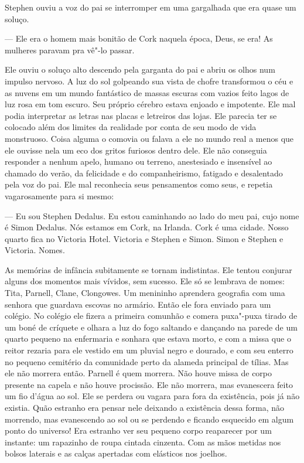Stephen ouviu a voz do pai se interromper em uma gargalhada que era
quase um soluço.

 --- Ele era o homem mais bonitão de Cork naquela época, Deus, se era! As
mulheres paravam pra vê"-lo passar.

Ele ouviu o soluço alto descendo pela garganta do pai e abriu os olhos
num impulso nervoso. A luz do sol golpeando sua vista de chofre
transformou o céu e as nuvens em um mundo fantástico de massas escuras
com vazios feito lagos de luz rosa em tom escuro. Seu próprio cérebro
estava enjoado e impotente. Ele mal podia interpretar as letras nas
placas e letreiros das lojas. Ele parecia ter se colocado além dos
limites da realidade por conta de seu modo de vida monstruoso. Coisa
alguma o comovia ou falava a ele no mundo real a menos que ele ouvisse
nela um eco dos gritos furiosos dentro dele. Ele não conseguia
responder a nenhum apelo, humano ou terreno, anestesiado e insensível
ao chamado do verão, da felicidade e do companheirismo, fatigado e
desalentado pela voz do pai. Ele mal reconhecia seus pensamentos como
seus, e repetia vagarosamente para si mesmo:

 --- Eu sou Stephen Dedalus. Eu estou caminhando ao lado do meu pai, cujo
nome é Simon Dedalus. Nós estamos em Cork, na Irlanda. Cork é uma
cidade. Nosso quarto fica no Victoria Hotel. Victoria e Stephen e
Simon. Simon e Stephen e Victoria. Nomes.

As memórias de infância subitamente se tornam indistintas. Ele tentou
conjurar alguns dos momentos mais vívidos, sem sucesso. Ele só se
lembrava de nomes: Tita, Parnell, Clane, Clongowes. Um menininho
aprendera geografia com uma senhora que guardava escovas no armário.
Então ele fora enviado para um colégio. No colégio ele fizera a
primeira comunhão e comera puxa"-puxa tirado de um boné de críquete e
olhara a luz do fogo saltando e dançando na parede de um quarto pequeno
na enfermaria e sonhara que estava morto, e com a missa que o reitor
rezaria para ele vestido em um pluvial negro e dourado, e com seu
enterro no pequeno cemitério da comunidade perto da alameda principal
de tílias. Mas ele não morrera então. Parnell é quem morrera. Não houve
missa de corpo presente na capela e não houve procissão. Ele não
morrera, mas evanescera feito um fio d’água ao sol.
Ele se perdera ou vagara para fora da existência, pois já não existia.
Quão estranho era pensar nele deixando a existência dessa forma, não
morrendo, mas evanescendo ao sol ou se perdendo e ficando esquecido em
algum ponto do universo! Era estranho ver seu pequeno corpo reaparecer
por um instante: um rapazinho de roupa cintada cinzenta. Com as mãos
metidas nos bolsos laterais e as calças apertadas com elásticos nos
joelhos.

